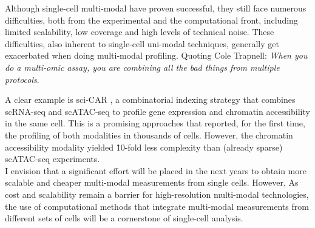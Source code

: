 
Although single-cell multi-modal have proven successful, they still face numerous difficulties, both from the experimental and the computational front, including limited scalability, low coverage and high levels of technical noise. These difficulties, also inherent to single-cell uni-modal techniques, generally get exacerbated when doing multi-modal profiling. Quoting Cole Trapnell: \textit{When you do a multi-omic assay, you are combining all the bad things from multiple protocols}.

A clear example is sci-CAR \cite{Cao2018a}, a combinatorial indexing strategy that combines scRNA-seq and scATAC-seq to profile gene expression and chromatin accessibility in the same cell. This is a promising approaches that reported, for the first time, the profiling of both modalities in thousands of cells. However, the  chromatin accessibility modality yielded \~10-fold less complexity than (already sparse) scATAC-seq experiments.\\

I envision that a significant effort will be placed in the next years to obtain more scalable and cheaper multi-modal measurements from single cells. However, As cost and scalability remain a barrier for high-resolution multi-modal technologies, the use of computational methods that integrate multi-modal measurements from different sets of cells will be a cornerstone of single-cell analysis.


